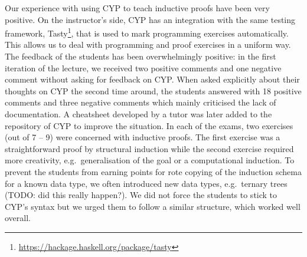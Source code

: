 Our experience with using CYP to teach inductive proofs have been very positive.
On the instructor's side, CYP has an integration with the same testing framework, Tasty\footnote{\url{https://hackage.haskell.org/package/tasty}}, that is used to mark programming exercises automatically.
This allows us to deal with programming and proof exercises in a uniform way.
The feedback of the students has been overwhelmingly positive:
in the first iteration of the lecture, we received two positive comments and one negative comment without asking for feedback on CYP.
When asked explicitly about their thoughts on CYP the second time around, the students answered with 18 positive comments and three negative comments which mainly criticised the lack of documentation.
A cheatsheet developed by a tutor was later added to the repository of CYP to improve the situation.
In each of the exams, two exercises (out of 7 -- 9) were concerned with inductive proofs.
The first exercise was a straightforward proof by structural induction while the second exercise required more creativity, e.g.\ generalisation of the goal or a computational induction.
To prevent the students from earning points for rote copying of the induction schema for a known data type, we often introduced new data types, e.g.\ ternary trees (TODO: did this really happen?).
We did not force the students to stick to CYP's syntax but we urged them to follow a similar structure, which worked well overall.


